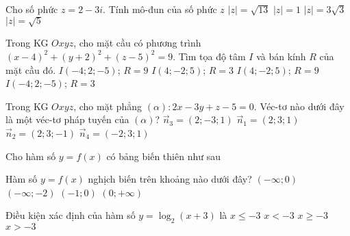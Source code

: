 \begin{ex}%
	Cho số phức $z=2-3i$. Tính mô-đun của số phức $z$
	\choice
	{\True $\vert z\vert=\sqrt{13}$}
	{$\vert z\vert=1$}
	{$\vert z\vert=3\sqrt{3}$}
	{$\vert z\vert=\sqrt{5}$}
\end{ex}


\begin{ex}%
	Trong KG $Oxyz$, cho mặt cầu có phương trình $(x-4)^2+(y+2)^2+(z-5)^2=9$. Tìm tọa độ tâm $I$ và bán kính $R$ của mặt cầu đó.
	\choice
	{$I(-4;2;-5)$; $R=9$}
	{\True $I(4;-2;5)$; $R=3$}
	{$I(4;-2;5)$; $R=9$}
	{$I(-4;2;-5)$; $R=3$}
\end{ex}


\begin{ex}%
	Trong KG $Oxyz$, cho mặt phẳng $(\alpha) \colon 2x-3y+z-5=0$. Véc-tơ nào dưới đây là một véc-tơ pháp tuyến của $(\alpha)$?
	\choice
	{\True $\overrightarrow{n}_3=(2;-3;1)$}
	{$\overrightarrow{n}_1=(2;3;1)$}
	{$\overrightarrow{n}_2=(2;3;-1)$}
	{$\overrightarrow{n}_4=(-2;3;1)$}
\end{ex}


\begin{ex}%
	Cho hàm số $y=f(x)$ có bảng biến thiên như sau
	\begin{center}
	\end{center}
	Hàm số $y=f(x)$ nghịch biến trên khoảng nào dưới đây?
	\choice
	{$(-\infty;0)$}
	{\True $(-\infty;-2)$}
	{$(-1;0)$}
	{$(0;+\infty)$}
\end{ex}


\begin{ex}%
	Điều kiện xác định của hàm số $y=\log _2(x+3)$ là
	\choice
	{$x\leq-3$}
	{$x<-3$}
	{$x\geq-3$}
	{\True $x>-3$}
\end{ex}


